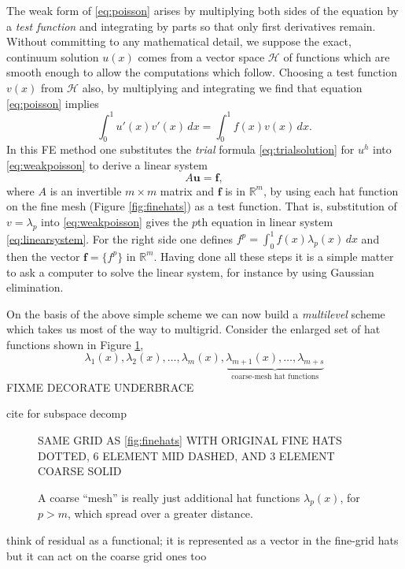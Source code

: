 \documentclass[letterpaper,final,12pt,reqno]{amsart}
\newcommand{\RR}{\mathbb{R}}
\newcommand{\bbf}{\mathbf{f}}
\newcommand{\bu}{\mathbf{u}}
\begin{document}
The weak form of \eqref{eq:poisson} arises by multiplying both sides of the equation by a \emph{test function} and integrating by parts so that only first derivatives remain.  Without committing to any mathematical detail, we suppose the exact, continuum solution $u(x)$ comes from a vector space $\mathcal{H}$ of functions which are smooth enough to allow the computations which follow.  Choosing a test function $v(x)$ from $\mathcal{H}$ also, by multiplying and integrating we find that equation \eqref{eq:poisson} implies
\begin{equation}
\int_0^1 u'(x) v'(x)\,dx = \int_0^1 f(x) v(x)\, dx.
\label{eq:weakpoisson}
\end{equation}
In this FE method one substitutes the \emph{trial} formula \eqref{eq:trialsolution} for $u^h$ into \eqref{eq:weakpoisson} to derive a linear system
\begin{equation}
A \bu = \bbf, \label{eq:linearsystem}
\end{equation}
where $A$ is an invertible $m\times m$ matrix and $\bbf$ is in $\RR^m$, by using each hat function on the fine mesh (Figure \ref{fig:finehats}) as a test function.  That is, substitution of $v=\lambda_p$ into \eqref{eq:weakpoisson} gives the $p$th equation in linear system \eqref{eq:linearsystem}.  For the right side one defines $f^p = \int_0^1 f(x) \lambda_p(x)\,dx$ and then the vector $\bbf = \{f^p\}$ in $\RR^m$.  Having done all these steps it is a simple matter to ask a computer to solve the linear system, for instance by using Gaussian elimination.

On the basis of the above simple scheme we can now build a \emph{multilevel} scheme which takes us most of the way to multigrid.  Consider the enlarged set of hat functions shown in Figure \ref{fig:multilevelhats},
    $$\lambda_1(x),\lambda_2(x),\dots,\lambda_m(x),\underbrace{\lambda_{m+1}(x),\dots,\lambda_{m+s}}_{\text{coarse-mesh hat functions}}$$
FIXME DECORATE UNDERBRACE

cite for subspace decomp \cite{Xu1992}

\begin{figure}
SAME GRID AS \eqref{fig:finehats} WITH ORIGINAL FINE HATS DOTTED, 6 ELEMENT MID DASHED, AND 3 ELEMENT COARSE SOLID
\caption{A coarse ``mesh'' is really just additional hat functions $\lambda_p(x)$, for $p>m$, which spread over a greater distance.}
\label{fig:multilevelhats}
\end{figure}


think of residual as a functional; it is represented as a vector in the fine-grid hats but it can act on the coarse grid ones too
\end{document}
